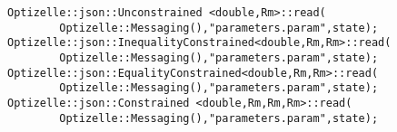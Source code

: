\begin{lstlisting}[style=C++]
Optizelle::json::Unconstrained <double,Rm>::read(
        Optizelle::Messaging(),"parameters.param",state);
Optizelle::json::InequalityConstrained<double,Rm,Rm>::read(
        Optizelle::Messaging(),"parameters.param",state);
Optizelle::json::EqualityConstrained<double,Rm,Rm>::read(
        Optizelle::Messaging(),"parameters.param",state);
Optizelle::json::Constrained <double,Rm,Rm,Rm>::read(
        Optizelle::Messaging(),"parameters.param",state);
\end{lstlisting}
